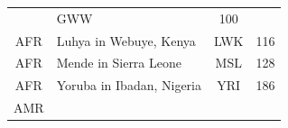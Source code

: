 \documentclass[]{book}
\begin{document}
\begin{longtable}[]{@{}clcc@{}}
\begin{minipage}[t]{0.59\columnwidth}
\end{minipage} & \begin{minipage}[t]{0.09\columnwidth}\centering\strut
GWW\strut
\end{minipage} & \begin{minipage}[t]{0.07\columnwidth}\centering\strut
100\strut
\end{minipage}\tabularnewline
\begin{minipage}[t]{0.14\columnwidth}\centering\strut
AFR\strut
\end{minipage} & \begin{minipage}[t]{0.59\columnwidth}\raggedright\strut
Luhya in Webuye, Kenya\strut
\end{minipage} & \begin{minipage}[t]{0.09\columnwidth}\centering\strut
LWK\strut
\end{minipage} & \begin{minipage}[t]{0.07\columnwidth}\centering\strut
116\strut
\end{minipage}\tabularnewline
\begin{minipage}[t]{0.14\columnwidth}\centering\strut
AFR\strut
\end{minipage} & \begin{minipage}[t]{0.59\columnwidth}\raggedright\strut
Mende in Sierra Leone\strut
\end{minipage} & \begin{minipage}[t]{0.09\columnwidth}\centering\strut
MSL\strut
\end{minipage} & \begin{minipage}[t]{0.07\columnwidth}\centering\strut
128\strut
\end{minipage}\tabularnewline
\begin{minipage}[t]{0.14\columnwidth}\centering\strut
AFR\strut
\end{minipage} & \begin{minipage}[t]{0.59\columnwidth}\raggedright\strut
Yoruba in Ibadan, Nigeria\strut
\end{minipage} & \begin{minipage}[t]{0.09\columnwidth}\centering\strut
YRI\strut
\end{minipage} & \begin{minipage}[t]{0.07\columnwidth}\centering\strut
186\strut
\end{minipage}\tabularnewline
\begin{minipage}[t]{0.14\columnwidth}\centering\strut
AMR\strut
\end{minipage} & \begin{minipage}[t]{0.59\columnwidth}\raggedright\strut

\end{minipage}
\end{longtable}
\end{document}
